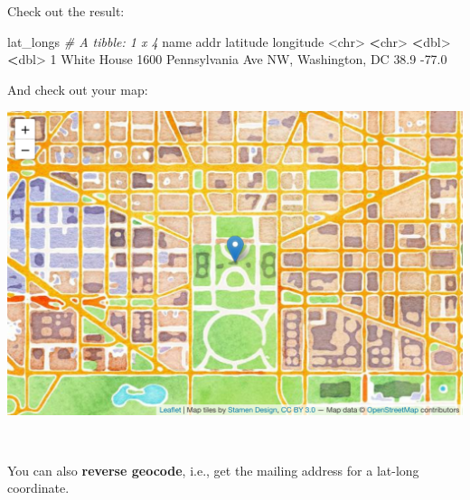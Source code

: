 \documentclass[
]{book}
\newenvironment{Shaded}{\begin{snugshade}}{\end{snugshade}}
\newcommand{\AttributeTok}[1]{\textcolor[rgb]{0.77,0.63,0.00}{#1}}
\newcommand{\CommentTok}[1]{\textcolor[rgb]{0.56,0.35,0.01}{\textit{#1}}}
\newcommand{\DecValTok}[1]{\textcolor[rgb]{0.00,0.00,0.81}{#1}}
\newcommand{\ErrorTok}[1]{\textcolor[rgb]{0.64,0.00,0.00}{\textbf{#1}}}
\newcommand{\FloatTok}[1]{\textcolor[rgb]{0.00,0.00,0.81}{#1}}
\newcommand{\FunctionTok}[1]{\textcolor[rgb]{0.00,0.00,0.00}{#1}}
\newcommand{\NormalTok}[1]{#1}
\newcommand{\SpecialCharTok}[1]{\textcolor[rgb]{0.00,0.00,0.00}{#1}}
\begin{document}
Check out the result:

\begin{Shaded}
\begin{Highlighting}[]
\NormalTok{lat\_longs}
\CommentTok{\# A tibble: 1 x 4}
\NormalTok{  name        addr                                     latitude longitude}
  \SpecialCharTok{\textless{}}\NormalTok{chr}\SpecialCharTok{\textgreater{}}       \ErrorTok{\textless{}}\NormalTok{chr}\SpecialCharTok{\textgreater{}}                                       \ErrorTok{\textless{}}\NormalTok{dbl}\SpecialCharTok{\textgreater{}}     \ErrorTok{\textless{}}\NormalTok{dbl}\SpecialCharTok{\textgreater{}}
\DecValTok{1}\NormalTok{ White House }\DecValTok{1600}\NormalTok{ Pennsylvania Ave NW, Washington, DC     }\FloatTok{38.9}     \SpecialCharTok{{-}}\FloatTok{77.0}
\end{Highlighting}
\end{Shaded}

And check out your map:

\begin{Shaded}
\end{Shaded}

\includegraphics[width=694.08px]{figures/unnamed-chunk-235-1}

~

You can also \textbf{reverse geocode}, i.e., get the mailing address for a lat-long coordinate.
\end{document}
